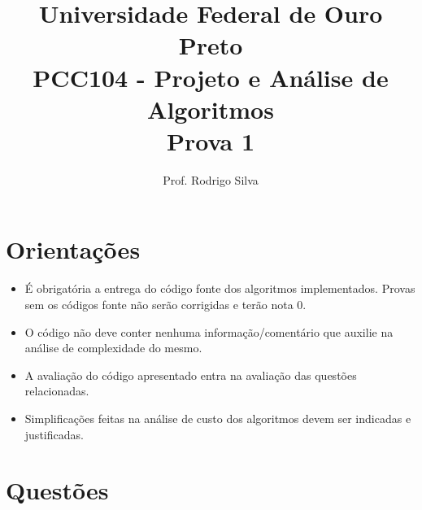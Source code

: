 \documentclass{article}
\title{\vspace{-2 cm}Universidade Federal de Ouro Preto \\ PCC104 - Projeto e Análise de Algoritmos \\ Prova 1}
\author{Prof. Rodrigo Silva}
\begin{document}
\maketitle

\section*{Orientações}

\begin{itemize}
    \item É obrigatória a entrega do código fonte dos algoritmos implementados. Provas sem os códigos fonte não serão corrigidas e terão nota 0.
    \item O código não deve conter nenhuma informação/comentário que auxilie na análise de complexidade do mesmo. 
    \item A avaliação do código apresentado entra na avaliação das questões relacionadas. 
    \item Simplificações feitas na análise de custo dos algoritmos devem ser indicadas e justificadas.
\end{itemize}

\section*{Questões}
\end{document}
